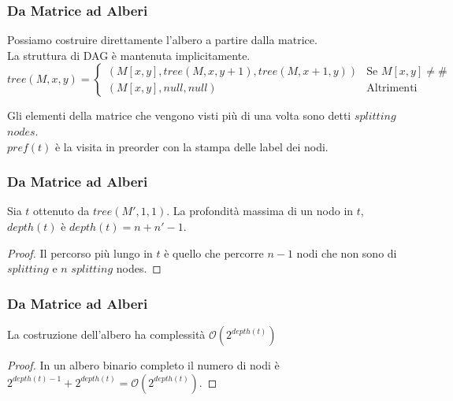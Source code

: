 \documentclass{beamer}
\newcommand{\bigO}{\ensuremath{\mathcal{O}}} %
\begin{document}
\begin{frame}
\frametitle{Da Matrice ad Alberi}
Possiamo costruire direttamente l'albero a partire dalla matrice.\\
La struttura di DAG è mantenuta implicitamente.\\
\fontsize{10pt}{7.2}\selectfont
\[
	tree(M,x,y) = \begin{cases}
		(M[x,y], tree(M,x,y+1) , tree(M,x+1,y) ) & \text{Se $M[x,y] \not = \#$ }\\
		(M[x,y], null, null) & \text{Altrimenti}
	\end{cases}
\]
\fontsize{12pt}{7.2}\selectfont
\begin{definition}
Gli elementi della matrice che vengono visti più di una volta sono detti $splitting$ $nodes$.\\
$pref(t)$ è la visita in preorder con la stampa delle label dei nodi.
\end{definition}
\end{frame}

\begin{frame}
\frametitle{Da Matrice ad Alberi}
\begin{theorem}[]
Sia $t$ ottenuto da $tree(M',1,1)$. La profondità massima di un nodo in $t$, $depth(t)$ è $depth(t) = n + n' -1$. 
\end{theorem}


\begin{proof}
Il percorso più lungo in $t$ è quello che percorre $n -1$ nodi che non sono di $splitting$ e $n$ $splitting$ nodes.
\end{proof}

\frametitle{Da Matrice ad Alberi}
\begin{theorem}[]
La costruzione dell'albero ha complessità $\bigO{(2^{depth(t)})}$
\end{theorem}


\begin{proof}
In un albero binario completo il numero di nodi è $2^{depth(t)-1} + 2^{depth(t)} = \bigO{(2^{depth(t)})}$. 
\end{proof}
\end{frame}
\end{document}
